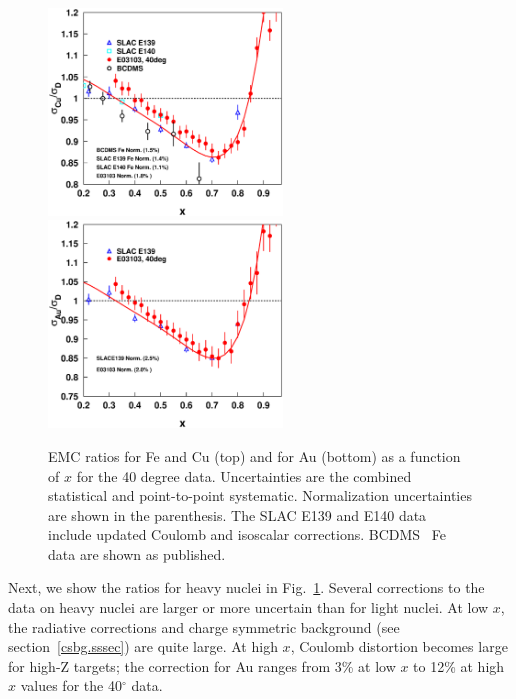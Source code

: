 \begin{figure}[htbp]
\begin{center}
\includegraphics[width=.44\textwidth,height=55mm]{plots/slacWithallcorr_e03103_40deg_emc_x_cu_slace140loeps.eps}
\includegraphics[width=.44\textwidth,height=55mm]{plots/slacWithallcorr_e03103_40deg_emc_x_au.eps}
\caption{EMC ratios for Fe and Cu (top) and for Au (bottom) as a function of
$x$ for the 40 degree data. Uncertainties are the combined statistical and
point-to-point systematic. Normalization uncertainties are shown in the
parenthesis. The SLAC E139 and E140 data include updated Coulomb and isoscalar
corrections. BCDMS~\cite{Benvenuti:1987az} Fe data are shown as published.
\label{emc_x_40deg_cu_fig}}
\end{center}
\end{figure}

Next, we show the ratios for heavy nuclei in Fig.~\ref{emc_x_40deg_cu_fig}.
Several corrections to the data on heavy nuclei are larger or more uncertain
than for light nuclei. At low $x$, the radiative corrections and charge
symmetric background (see section~\ref{csbg.sssec}) are quite large. At high
$x$, Coulomb distortion becomes large for high-Z targets; the correction for
Au ranges from 3\% at low $x$ to 12\% at high $x$ values for the 40$^\circ$
data.



